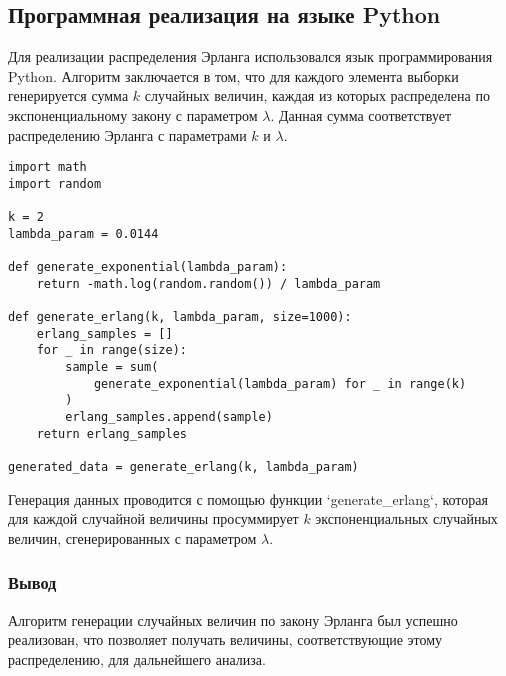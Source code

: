 \subsection{Программная реализация на языке Python}

Для реализации распределения Эрланга использовался язык программирования Python. Алгоритм заключается в том, что для каждого элемента выборки генерируется сумма \( k \) случайных величин, каждая из которых распределена по экспоненциальному закону с параметром \( \lambda \). Данная сумма соответствует распределению Эрланга с параметрами \( k \) и \( \lambda \).

\begin{lstlisting}
import math
import random

k = 2
lambda_param = 0.0144

def generate_exponential(lambda_param):
    return -math.log(random.random()) / lambda_param

def generate_erlang(k, lambda_param, size=1000):
    erlang_samples = []
    for _ in range(size):
        sample = sum(
            generate_exponential(lambda_param) for _ in range(k)
        )
        erlang_samples.append(sample)
    return erlang_samples

generated_data = generate_erlang(k, lambda_param)
\end{lstlisting}

Генерация данных проводится с помощью функции `generate\_erlang`, которая для каждой случайной величины просуммирует \( k \) экспоненциальных случайных величин, сгенерированных с параметром \( \lambda \).

\subsubsection{Вывод}

Алгоритм генерации случайных величин по закону Эрланга был успешно реализован, что позволяет получать величины, соответствующие этому распределению, для дальнейшего анализа.
